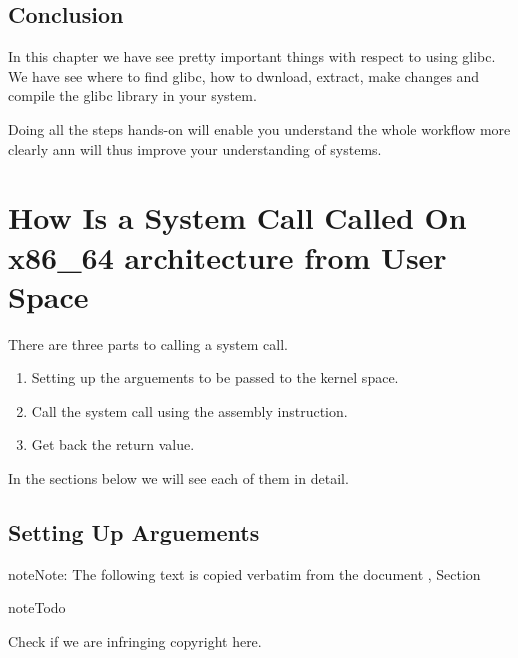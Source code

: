 \documentclass[letterpaper,10pt,english]{sphinxmanual}
\begin{document}
\section{Conclusion}
\label{\detokenize{03_glibc:conclusion}}
In this chapter we have see pretty important things with respect to using glibc. We have see where to find glibc, how to dwnload, extract, make changes and compile the glibc library in your system.

Doing all the steps hands-on will enable you understand the whole workflow more clearly ann will thus improve your understanding of systems.


\chapter{How Is a System Call Called On x86\_64 architecture from User Space}
\label{\detokenize{05_calling_system_calls:how-is-a-system-call-called-on-x86-64-architecture-from-user-space}}\label{\detokenize{05_calling_system_calls::doc}}
There are three parts to calling a system call.
\begin{enumerate}
\item {} 
Setting up the arguements to be passed to the kernel space.

\item {} 
Call the system call using the  assembly instruction.

\item {} 
Get back the return value.

\end{enumerate}

In the sections below we will see each of them in detail.


\section{Setting Up Arguements}
\label{\detokenize{05_calling_system_calls:setting-up-arguements}}
\begin{sphinxadmonition}{note}{Note:}
The following text is copied verbatim from the document , Section 
\end{sphinxadmonition}

\begin{sphinxadmonition}{note}{Todo}

Check if we are infringing copyright here.
\end{sphinxadmonition}
\end{document}

